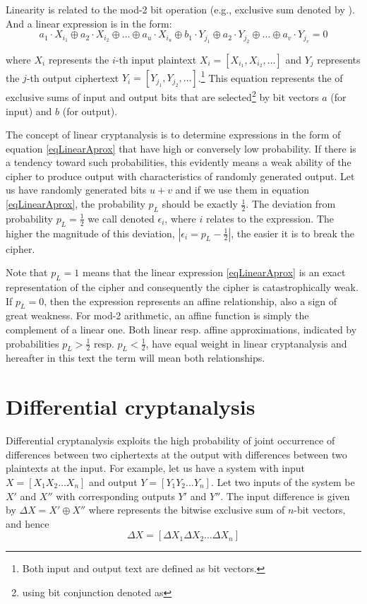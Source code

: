 Linearity is related to the mod-2 bit operation (e.g.,
exclusive sum denoted by \uv{$\oplus$}). And a linear expression is in the form:
\begin{equation}
  a_1 \cdot X_{i_1} \oplus a_2 \cdot X_{i_2} \oplus \dots \oplus a_u \cdot X_{i_u} \oplus
  b_1 \cdot Y_{j_1} \oplus a_2 \cdot Y_{j_2} \oplus \dots \oplus a_v \cdot Y_{j_v} = 0
  \label{eqLinearAprox}
\end{equation}

where $X_i$ represents the $i$-th input plaintext $X_i = [X_{i_1}, {X_{i_2}}, \dots]$
and $Y_j$ represents the $j$-th output ciphertext
$Y_i = [Y_{j_1}, Y_{j_2}, \dots]$.\footnote{Both input and output text are defined as bit vectors.}
This equation represents the  of exclusive sums of input and output bits that are
selected\footnote{ using bit conjunction denoted as \uv{$\cdot$}}
by bit vectors $a$ (for input) and $b$ (for output).


The concept of linear cryptanalysis is to determine expressions in the form of equation \ref{eqLinearAprox} that have
high or conversely low probability. If there is a tendency toward such probabilities,
this evidently means a weak ability of the cipher to produce output with characteristics
of randomly generated output.
Let us have randomly generated bits $u + v$ and if we use them in equation \ref{eqLinearAprox},
the probability $p_L$ should be exactly $\frac{1}{2}$. The deviation from probability
$p_L = \frac{1}{2}$ we call  denoted $\epsilon_i$, where $i$ relates to the expression.
The higher the magnitude of this deviation, $|\epsilon_i = p_L - \frac{1}{2}|$, the easier it is to break the cipher.

Note that $p_L = 1$ means that the linear expression \ref{eqLinearAprox} is an exact representation
of the cipher and consequently the cipher is catastrophically weak. If $p_L = 0$, then the expression represents
an affine relationship, also a sign of great weakness. For mod-2 arithmetic,
an affine function is simply the complement of a linear one. Both
linear resp. affine approximations, indicated by probabilities $p_L > \frac{1}{2}$ resp.  $p_L < \frac{1}{2}$,
have equal weight in linear cryptanalysis and hereafter in this text the term  will mean
both relationships.

\pagebreak
\section{Differential cryptanalysis}
Differential cryptanalysis \cite{tutorialLADA} exploits
the high probability of joint occurrence of differences between two ciphertexts
at the output with differences between two plaintexts at the input. For example, let us have
a system with input $X = [X_1 X_2 \dots X_n]$ and output $Y = [Y_1 Y_2 \dots Y_n]$.
Let two inputs of the system be $X'$ and $X''$ with corresponding outputs $Y'$ and $Y''$. The input
difference is given by $\Delta X = X' \oplus X''$ where \uv{$\oplus$} represents
the bitwise exclusive sum of $n$-bit vectors, and hence
\begin{equation}
  \Delta X = [\Delta X_1 \Delta X_2 \dots \Delta X_n ]
\end{equation}

